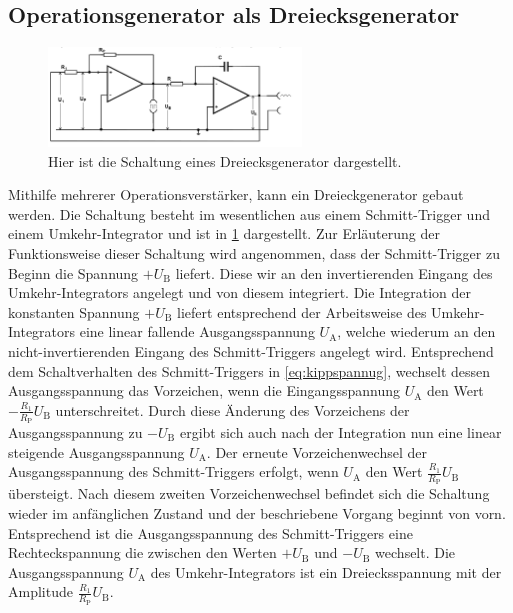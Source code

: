 \subsection{Operationsgenerator als Dreiecksgenerator}
\begin{figure}[h!]
	\centering
	\includegraphics[width = 0.6\textwidth]{../Grafiken/Dreieckgenerator.png}
	\caption{Hier ist die Schaltung eines Dreiecksgenerator dargestellt. \cite{V51} \label{fig:Dreieck}}
\end{figure}
\noindent
Mithilfe mehrerer Operationsverstärker, kann ein Dreieckgenerator gebaut werden.
Die Schaltung besteht im wesentlichen aus einem Schmitt-Trigger und einem Umkehr-Integrator und ist in \cref{fig:Dreieck} dargestellt. Zur Erläuterung der Funktionsweise dieser Schaltung wird angenommen,
dass der Schmitt-Trigger zu Beginn die Spannung $+U_{\mathrm{B}}$ liefert. Diese wir an den invertierenden 
Eingang des Umkehr-Integrators angelegt und von diesem integriert. Die Integration der konstanten Spannung 
$+U_{\mathrm{B}}$ liefert entsprechend der Arbeitsweise des Umkehr-Integrators eine linear fallende Ausgangsspannung
$U_{\mathrm{A}}$, welche wiederum an den nicht-invertierenden Eingang des Schmitt-Triggers angelegt wird.
Entsprechend dem Schaltverhalten des Schmitt-Triggers in \cref{eq:kippspannug}, wechselt dessen Ausgangsspannung 
das Vorzeichen, wenn die Eingangsspannung $U_{\mathrm{A}}$ den Wert $-\frac{R_1}{R_\text{P}}U_\text{B}$ 
unterschreitet.
Durch diese Änderung des Vorzeichens der Ausgangsspannung zu $-U_{\mathrm{B}}$ ergibt sich auch nach der
Integration nun eine linear steigende Ausgangsspannung $U_{\mathrm{A}}$. Der erneute Vorzeichenwechsel der 
Ausgangsspannung des 
Schmitt-Triggers erfolgt, wenn $U_{\mathrm{A}}$ den Wert $\frac{R_1}{R_\text{P}}U_\text{B}$ 
übersteigt. Nach diesem zweiten Vorzeichenwechsel befindet sich die Schaltung wieder im anfänglichen Zustand
und der beschriebene Vorgang beginnt von vorn.
Entsprechend ist die Ausgangsspannung des Schmitt-Triggers eine Rechteckspannung die zwischen den 
Werten $+U_{\mathrm{B}}$ und $-U_{\mathrm{B}}$ wechselt. Die Ausgangsspannung $U_{\mathrm{A}}$ des 
Umkehr-Integrators ist ein Dreiecksspannung mit der Amplitude $\frac{R_1}{R_\text{P}}U_\text{B}$. 

